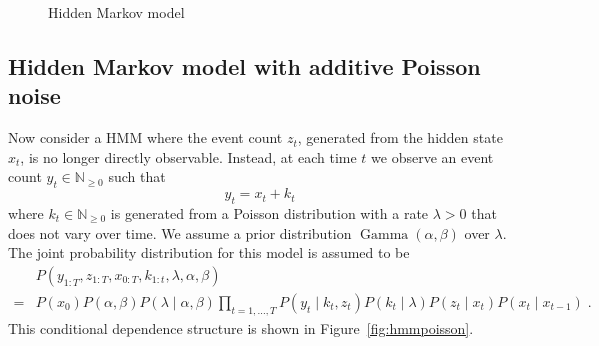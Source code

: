 \documentclass[twoside, 11pt]{article}
\DeclareMathOperator*{\gammad}{Gamma}
\newcommand{\nonnegint}[0] {\mathbb{N}_{\geq 0}}
\begin{document}
\begin{figure}[H]
\caption{Hidden Markov model}
\label{fig:hmm}
\end{figure}

\subsection{Hidden Markov model with additive Poisson noise}

Now consider a HMM where the event count $z_t$, generated from the hidden state $x_t$, is no longer directly observable. Instead, at each time $t$ we observe an event count $y_t \in \nonnegint$ such that
\begin{equation}
y_t = x_t + k_t
\end{equation}
where $k_t \in \nonnegint$ is generated from a Poisson distribution with a rate $\lambda > 0$ that does not vary over time. We assume a prior distribution $\gammad(\alpha, \beta)$ over $\lambda$. The joint probability distribution for this model is assumed to be
\begin{align}
& P(y_{1:T}, z_{1:T}, x_{0:T}, k_{1:t}, \lambda, \alpha, \beta) \nonumber \\
= & P(x_0) P(\alpha, \beta) P(\lambda \mid \alpha, \beta) \prod_{t=1, \ldots, T} P(y_t \mid k_t, z_t) P(k_t \mid \lambda) P(z_t \mid x_t) P(x_t \mid x_{t-1} ) \; .
\end{align}
This conditional dependence structure is shown in Figure~\ref{fig:hmmpoisson}.
\end{document}
